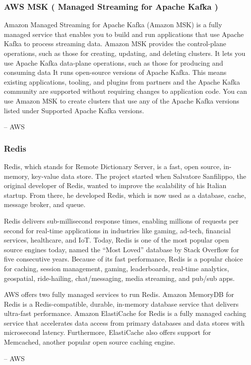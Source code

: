 \documentclass{csse4400}
\begin{document}

\subsubsection{AWS MSK ( Managed Streaming for Apache Kafka )}
\begin{oldquote}
Amazon Managed Streaming for Apache Kafka (Amazon MSK) is a fully managed service that enables you to build and run applications that use Apache Kafka to process streaming data.
Amazon MSK provides the control-plane operations, such as those for creating, updating, and deleting clusters.
It lets you use Apache Kafka data-plane operations,
such as those for producing and consuming data
It runs open-source versions of Apache Kafka.
This means existing applications, tooling, and plugins from partners and the Apache Kafka community are supported without requiring changes to application code.
You can use Amazon MSK to create clusters that use any of the Apache Kafka versions listed under Supported Apache Kafka versions.

\raggedleft -- AWS
\end{oldquote}


\subsubsection{Redis}
\begin{oldquote}
Redis, which stands for Remote Dictionary Server,
is a fast, open source, in-memory, key-value data store.
The project started when Salvatore Sanfilippo,
the original developer of Redis,
wanted to improve the scalability of his Italian startup.
From there, he developed Redis,
which is now used as a database, cache, message broker, and queue.

Redis delivers sub-millisecond response times,
enabling millions of requests per second for real-time applications in industries like gaming, ad-tech, financial services, healthcare, and IoT.
Today, Redis is one of the most popular open source engines today,
named the ``Most Loved'' database by Stack Overflow for five consecutive years.
Because of its fast performance,
Redis is a popular choice for caching, session management, gaming, leaderboards, real-time analytics, geospatial, ride-hailing, chat/messaging, media streaming, and pub/sub apps.
  
AWS offers two fully managed services to run Redis.
Amazon MemoryDB for Redis is a Redis-compatible, durable, in-memory database service that delivers ultra-fast performance.
Amazon ElastiCache for Redis is a fully managed caching service that accelerates data access from primary databases and data stores with microsecond latency.
Furthermore, ElastiCache also offers support for Memcached, another popular open source caching engine.

\raggedleft -- AWS
\end{oldquote}
\end{document}
